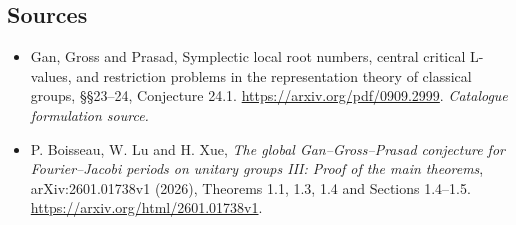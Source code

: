 \documentclass[11pt,a4paper]{article}
\numberwithin{equation}{section}
\begin{document}
\subsection{Sources}
\begin{itemize}\raggedright
\item[\textnormal{[S1]}]\hypertarget{source:30006977:1}{} Gan, Gross and Prasad, Symplectic local root numbers, central critical L-values, and restriction problems in the representation theory of classical groups, §§23–24, Conjecture 24.1.
\url{https://arxiv.org/pdf/0909.2999}.
{\small\textit{Catalogue formulation source.}}
\item[\textnormal{[E1]}]\hypertarget{extra:30006977:1}{} P. Boisseau, W. Lu and H. Xue,
\emph{The global Gan--Gross--Prasad conjecture for Fourier--Jacobi periods
on unitary groups III: Proof of the main theorems}, arXiv:2601.01738v1
(2026), Theorems 1.1, 1.3, 1.4 and Sections 1.4--1.5.
\url{https://arxiv.org/html/2601.01738v1}.

\end{itemize}
\end{document}
